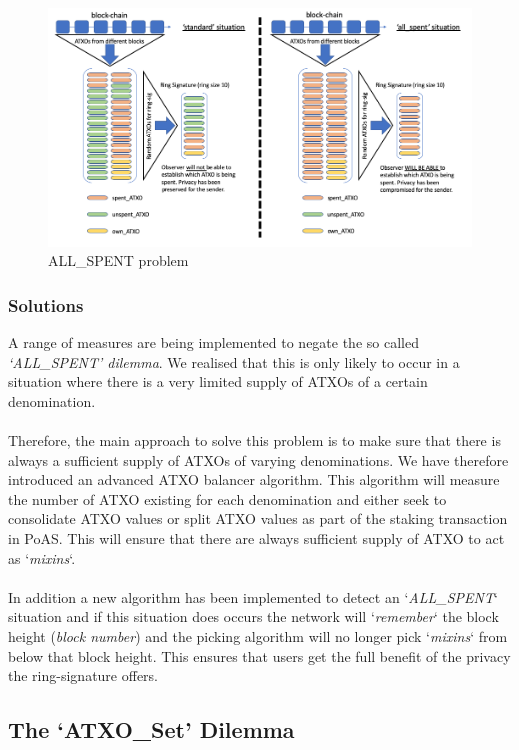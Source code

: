 \begin{figure}[ht]
    \centering
    \includegraphics[width=\textwidth]{Images/allspentproblem.png}
    \caption{ALL\_SPENT problem}
    \label{fig:my_label}
\end{figure}

\subsubsection{Solutions}
A range of measures are being implemented to negate the so called
\textit{‘ALL\_SPENT’ dilemma}. We realised that this is only likely
to occur in a situation where there is a very limited supply of
ATXOs of a certain denomination.
\\
\\
\noindent
Therefore, the main approach to solve this problem is to make sure that
there is always a sufficient supply of ATXOs of varying denominations.
We have therefore introduced an advanced ATXO balancer algorithm. This
algorithm will measure the number of ATXO existing for each denomination
and either seek to consolidate ATXO values or split ATXO values as part
of the staking transaction in PoAS. This will ensure that there are
always sufficient supply of ATXO to act as ‘\textit{mixins}‘.
\\
\\
\noindent
In addition a new algorithm has been implemented to detect an
‘\textit{ALL\_SPENT}‘ situation and if this situation does occurs
the network will ‘\textit{remember}‘ the block height (\textit{block number})
and the picking algorithm will no longer pick ‘\textit{mixins}‘
from below that block height. This ensures that users get the full
benefit of the privacy the ring-signature offers.



\subsection{The ‘ATXO\_Set’ Dilemma}

